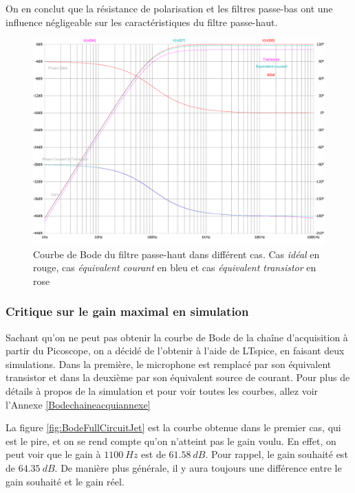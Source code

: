 On en conclut que la résistance de polarisation et les filtres passe-bas ont une influence négligeable sur les caractéristiques du filtre passe-haut.



\begin{figure}[H]
    \centering
    \includegraphics[width=\textwidth]{pdffiles/HighPass/BodeHighPassImpactePolarisation.pdf}
    \caption{Courbe de Bode du filtre passe-haut dans différent cas. Cas \textit{idéal} en rouge, cas \textit{équivalent courant} en bleu et cas \textit{équivalent transistor} en rose }
    \label{fig:bodesim}
\end{figure}

\subsubsection{Critique sur le gain maximal en simulation}

Sachant qu'on ne peut pas obtenir la courbe de Bode de la chaîne d'acquisition à partir du Picoscope, on a décidé de l'obtenir à l'aide de LTspice, en faisant deux simulations. Dans la première, le microphone est remplacé par son équivalent transistor et dans la deuxième par son équivalent source de courant. Pour plus de détails à propos de la simulation et pour voir toutes les courbes, allez voir l'Annexe \ref{Bodechaineacquiannexe}

La figure \ref{fig:BodeFullCircuitJet} est la courbe obtenue dans le premier cas, qui est le pire, et on se rend compte qu'on n'atteint pas le gain voulu. En effet, on peut voir que le gain à $1100 \ Hz$ est de $61.58 \ dB$. Pour rappel, le gain souhaité est de $64.35 \ dB$. 
De manière plus générale, il y aura toujours une différence entre le gain souhaité et le gain réel.

